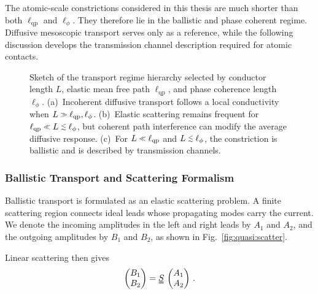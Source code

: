         The atomic-scale constrictions considered in this thesis are much shorter than both $\ell_\mathrm{qp}$ and $\ell_\phi$. They therefore lie in the ballistic and phase coherent regime. Diffusive mesoscopic transport serves only as a reference, while the following discussion develops the transmission channel description required for atomic contacts.

        \begin{figure}
            \centering
            \hfill
            \hfill
            \caption{
            Sketch of the transport regime hierarchy selected by conductor length $L$, elastic mean free path $\ell_{\mathrm{qp}}$, and phase coherence length $\ell_{\phi}$. (a)~Incoherent diffusive transport follows a local conductivity when $L \sgg \ell_{\mathrm{qp}},\ell_{\phi}$. (b)~Elastic scattering remains frequent for $\ell_{\mathrm{qp}} \sll L \slesssim \ell_{\phi}$, but coherent path interference can modify the average diffusive response. (c)~For $L \sll \ell_{\mathrm{qp}}$ and $L \slesssim \ell_{\phi}$, the constriction is ballistic and is described by transmission channels.
            }
            \label{fig:quasi:meso}
        \end{figure}

        \subsubsection*{Ballistic Transport and Scattering Formalism}

            Ballistic transport is formulated as an elastic scattering problem. A finite scattering region connects ideal leads whose propagating modes carry the current. We denote the incoming amplitudes in the left and right leads by $A_1$ and $A_2$, and the outgoing amplitudes by $B_1$ and $B_2$, as shown in Fig.~\ref{fig:quasi:scatter}.

            Linear scattering then gives
            \begin{equation}
                \begin{pmatrix} B_1 \\ B_2 \end{pmatrix} = \mat{S}\,\begin{pmatrix} A_1 \\ A_2 \end{pmatrix}\,.
                \label{eq:meso:scattering-matrix}
            \end{equation}

